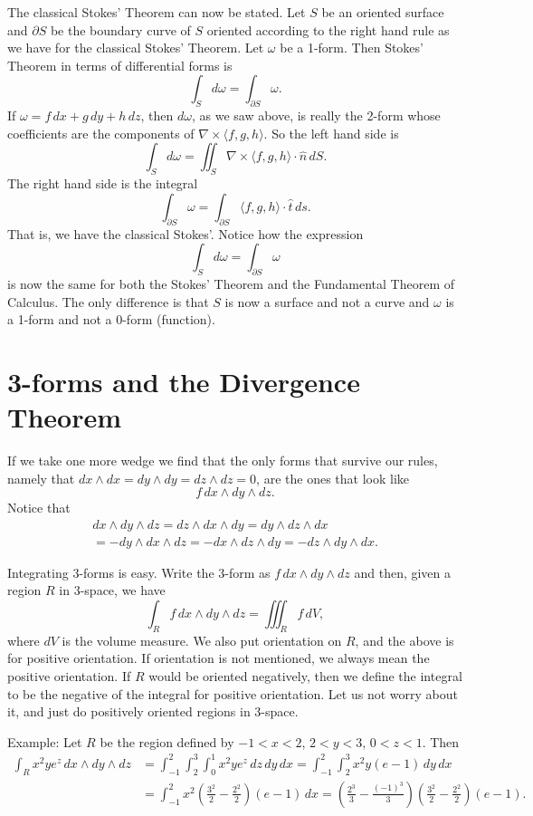 \documentclass[12pt]{article}
\begin{document}
The classical Stokes' Theorem can now be stated.  Let $S$ be an oriented
surface and $\partial S$ be the boundary curve of $S$ oriented according to
the right hand rule as we have for the classical Stokes' Theorem.
Let $\omega$ be a 1-form.  Then Stokes' Theorem in terms of
differential forms is
\[
\int_S d \omega = \int_{\partial S} \omega .
\]
If $\omega = f \, dx + g \, dy + h \, dz$, then
$d \omega$, as we saw above, is really the 2-form whose coefficients are
the components of $\nabla \times \langle f , g, h \rangle$.  So the left 
hand side is
\[
\int_S d \omega = \iint_S 
\nabla \times \langle f , g, h \rangle \cdot \hat{n} \, dS .
\]
The right hand side is the integral 
\[
\int_{\partial S} \omega =
\int_{\partial S} 
\langle f , g, h \rangle \cdot \hat{t} \, ds .
\]
That is,
we have the classical Stokes'.
Notice how the expression
\[
\int_S d \omega = \int_{\partial S} \omega
\]
is now the same for both the Stokes' Theorem and the Fundamental Theorem of
Calculus.  The only difference is that $S$ is now a surface and not a curve and 
$\omega$ is a 1-form and not a 0-form (function).

\section*{3-forms and the Divergence Theorem}

If we take one more wedge we find that the only forms that survive our
rules, namely that $dx \wedge dx = dy \wedge dy = dz \wedge dz = 0$,
are the ones that look like
\[
f \, dx \wedge dy \wedge dz .
\]
Notice that
\begin{multline*}
dx \wedge dy \wedge dz
=
dz \wedge dx \wedge dy
=
dy \wedge dz \wedge dx
\\
=
- 
dy \wedge dx \wedge dz
=
-
dx \wedge dz \wedge dy
=
-
dz \wedge dy \wedge dx .
\end{multline*}

Integrating 3-forms is easy.  Write the 3-form as $f \, dx \wedge dy \wedge
dz$ and then, given a region $R$ in 3-space, we have
\[
\int_R f \, dx \wedge dy \wedge dz
=
\iiint_R f\, dV ,
\]
where $dV$ is the volume measure.  We also put orientation on $R$, and
the above is for positive orientation.  If orientation is not mentioned, we
always mean the positive orientation.  If $R$ would be
oriented negatively, then we define the integral
to be the negative of the integral for positive orientation.
Let us not worry about it, and just do positively oriented
regions in 3-space.

Example:  Let $R$ be the region defined by $-1 < x < 2$, $2 < y < 3$, $0<z<1$.
Then
\begin{equation*}
\begin{split}
\int_R x^2 y e^z \, dx \wedge dy \wedge dz
& =
\int_{-1}^2 \int_2^3 \int_0^1 
x^2 y e^z \, dz \, dy \, dx
=
\int_{-1}^2 \int_2^3 
x^2 y (e-1) \, dy \, dx
\\
& =
\int_{-1}^2
x^2 \left(\frac{3^2}{2} - \frac{2^2}{2}\right) (e-1) \, dx
=
\left( \frac{2^3}{3} - \frac{(-1)^3}{3} \right) \left(\frac{3^2}{2} -
\frac{2^2}{2}\right) (e-1) .
\end{split}
\end{equation*}
\end{document}
